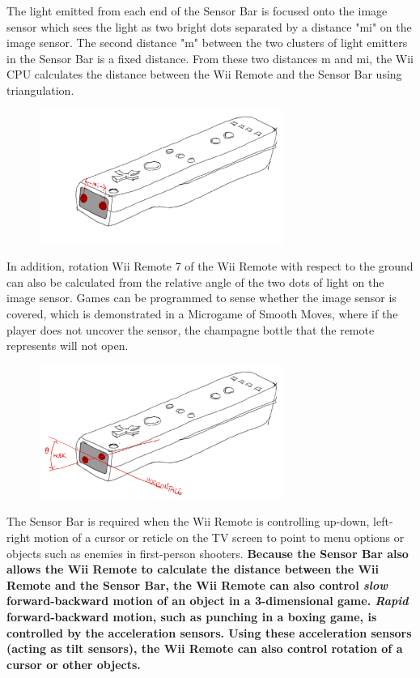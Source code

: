 \documentclass[11pt]{article}
\begin{document}
The light emitted from each end of the Sensor Bar is focused onto the image sensor which sees the light as two bright dots separated by a distance "mi" on the image sensor. The second distance "m" between the two clusters of light emitters in the Sensor Bar is a fixed distance. From these two distances m and mi, the Wii CPU calculates the distance between the Wii Remote and the Sensor Bar using triangulation. 

\begin{figure}[h] \begin{center}
\includegraphics[width=8cm]{wiiControllerSchetsOpticalSensor1.jpg}
\end{center} \end{figure}

In addition, rotation Wii Remote 7 of the Wii Remote with respect to the ground can also be calculated from the relative angle of the two dots of light on the image sensor. Games can be programmed to sense whether the image sensor is covered, which is demonstrated in a Microgame of Smooth Moves, where if the player does not uncover the sensor, the champagne bottle that the remote represents will not open.

\begin{figure}[h]\begin{center}
\includegraphics[width=8cm]{wiiControllerSchetsOpticalSensor2.jpg}
\end{center}\end{figure}

The Sensor Bar is required when the Wii Remote is controlling up-down, left-right motion of a cursor or reticle on the TV screen to point to menu options or objects such as enemies in first-person shooters. \textbf{Because the Sensor Bar also allows the Wii Remote to calculate the distance between the Wii Remote and the Sensor Bar, the Wii Remote can also control \textit{slow} forward-backward motion of an object in a 3-dimensional game. \textit{Rapid} forward-backward motion, such as punching in a boxing game, is controlled by the acceleration sensors. Using these acceleration sensors (acting as tilt sensors), the Wii Remote can also control rotation of a cursor or other objects.}\\
\end{document}
